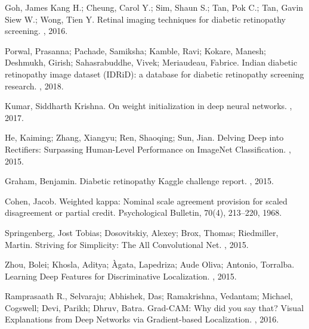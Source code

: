 \documentclass{article}
\begin{document}
  

\begin{thebibliography}{1}

  Goh, James Kang H.; Cheung, Carol Y.; Sim, Shaun S.; Tan, Pok C.; Tan, Gavin Siew W.; Wong, Tien Y.
  \newblock Retinal imaging techniques for diabetic retinopathy screening.
  , 2016.

  Porwal, Prasanna; Pachade, Samiksha; Kamble, Ravi; Kokare, Manesh; Deshmukh, Girish; Sahasrabuddhe, Vivek; Meriaudeau, Fabrice.
  \newblock Indian diabetic retinopathy image dataset (IDRiD): a database for diabetic retinopathy screening research.
  , 2018.

  Kumar, Siddharth Krishna.
  \newblock On weight initialization in deep neural networks.
  , 2017.

  He, Kaiming; Zhang, Xiangyu; Ren, Shaoqing; Sun, Jian.
  \newblock Delving Deep into Rectifiers: Surpassing Human-Level Performance on ImageNet Classification.
  , 2015.

  Graham, Benjamin.
  \newblock Diabetic retinopathy Kaggle challenge report.
  , 2015.

  Cohen, Jacob. 
  \newblock Weighted kappa: Nominal scale agreement provision for scaled disagreement or partial credit. 
  \newblock Psychological Bulletin, 70(4), 213–220, 1968. 
  
  Springenberg, Jost Tobias; Dosovitskiy, Alexey; Brox, Thomas; Riedmiller, Martin.
  \newblock Striving for Simplicity: The All Convolutional Net.
  , 2015.

  Zhou, Bolei; Khosla, Aditya; {\`{A}}gata, Lapedriza; Aude Oliva; Antonio, Torralba.
  \newblock Learning Deep Features for Discriminative Localization.
  , 2015.

  Ramprasaath R., Selvaraju; Abhishek, Das; Ramakrishna, Vedantam; Michael, Cogswell; Devi, Parikh; Dhruv, Batra.
  \newblock Grad-CAM: Why did you say that? Visual Explanations from Deep Networks via Gradient-based Localization.
  , 2016.

  \end{thebibliography}
\end{document}
